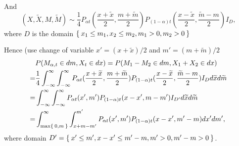 \documentclass[11pt]{book}
\def\tX{{\widetilde{X}}}
\def\tM{{\widetilde{M}}}
\def\tx{{\widetilde{x}}}
\def\tm{{\widetilde{m}}}
\begin{document}
And
\[
(X, \tX, M, \tM) \sim \frac{1}{4} P_{\alpha t}(\frac{x+\tx}{2},\frac{m+\tm}{2})
P_{(1-\alpha)t}(\frac{x-\tx}{2},\frac{\tm-m}{2}) I_D,
\]
where $D$ is the domain $\Set{x_1\leq m_1, x_2\leq m_2, m_1 >0, m_2>0}$


Hence (use change of variable $x' = (x+\tx)/2$ and $m' = (m+\tm)/2$
\[
\begin{split}
&P(M_{\alpha,t}\in dm, X_t \in dx) = P(M_1-M_2\in dm, X_1+X_2\in dx) \\
=& \frac{1}{4} \int_{-\infty}^{\infty}\int_{-\infty}^\infty
P_{\alpha t}(\frac{x+\tx}{2},\frac{m+\tm}{2})
P_{(1-\alpha)t}(\frac{x-\tx}{2},\frac{\tm-m}{2}) I_D d\tx d\tm\\
= & \int_{-\infty}^{\infty}\int_{-\infty}^\infty
P_{\alpha t}(x',m')
P_{(1-\alpha)t}(x-x',m-m') I_{D'} d\tx d\tm\\
= & \int_{\max\Set{0,m}}^{\infty} \int_{x+m-m'}^{m'}
P_{\alpha t}(x', m') P_{(1-\alpha)t}(x-x',m'-m) dx' dm',
\end{split}
\]
where domain $D' = \Set{x' \leq m', x-x'\leq m'-m, m'>0, m'-m>0}$.



\end{document}
